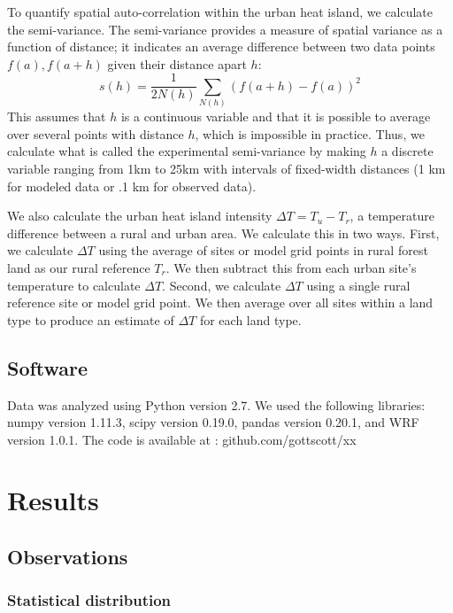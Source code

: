 \documentclass[draft,linenumbers]{agujournal}
\begin{document}
To quantify spatial auto-correlation within the urban heat island, we calculate the semi-variance. The semi-variance provides a measure of spatial variance as a function of distance; it indicates an average difference between two data points $f(a), f(a+h)$ given their distance apart $h$: 
\begin{equation}
 s(h) = \frac{1}{2 N(h)} \sum _{N(h)} \left(f(a+h) -f(a)\right)^2
\label{eq:semivariogram}
\end{equation}
This assumes that $h$ is a continuous variable and that it is possible to average over several points with distance $h$, which is impossible in practice. Thus, we calculate what is called the experimental semi-variance by making $h$ a discrete variable ranging from 1km to 25km with intervals of fixed-width distances (1 km for modeled data or .1 km for observed data). 

We also calculate the urban heat island intensity $\Delta T = T_u - T_r$, a temperature difference between a rural and urban area. We calculate this in two ways. First, we calculate $\Delta T$ using the average of sites or model grid points in rural forest land as our rural reference $T_r$. We then subtract this from each urban site's temperature to calculate $\Delta T$. 
Second, we calculate $\Delta T$ using a single rural reference site or model grid point. We then average over all sites within a land type to produce an estimate of $\Delta T$ for each land type. 

\subsection{Software}
Data was analyzed using Python version 2.7. We used the following libraries: numpy version 1.11.3, scipy version 0.19.0, pandas version 0.20.1, and WRF version 1.0.1. 
The code is available at :  github.com/gottscott/xx

\section{Results}\label{sec:results} 
\subsection{Observations}
\subsubsection{Statistical distribution}
\end{document}
